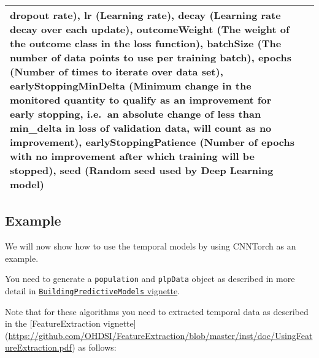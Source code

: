 \documentclass[
]{article}
\begin{document}
\begin{longtable}[]{@{}ll@{}}
\begin{minipage}[t]{0.83\columnwidth}
dropout rate), lr (Learning rate), decay (Learning rate decay over each
update), outcomeWeight (The weight of the outcome class in the loss
function), batchSize (The number of data points to use per training
batch), epochs (Number of times to iterate over data set),
earlyStoppingMinDelta (Minimum change in the monitored quantity to
qualify as an improvement for early stopping, i.e.~an absolute change of
less than min\_delta in loss of validation data, will count as no
improvement), earlyStoppingPatience (Number of epochs with no
improvement after which training will be stopped), seed (Random seed
used by Deep Learning model)\strut
\end{minipage}\tabularnewline
\bottomrule
\end{longtable}

\hypertarget{example}{%
\subsection{Example}\label{example}}

We will now show how to use the temporal models by using CNNTorch as an
example.

You need to generate a \texttt{population} and \texttt{plpData} object
as described in more detail in
\href{https://github.com/OHDSI/PatientLevelPrediction/blob/master/inst/doc/BuildingPredictiveModels.pdf}{\texttt{BuildingPredictiveModels}
vignette}.

Note that for these algorithms you need to extracted temporal data as
described in the {[}FeatureExtraction vignette{]}
(\url{https://github.com/OHDSI/FeatureExtraction/blob/master/inst/doc/UsingFeatureExtraction.pdf})
as follows:
\end{document}

